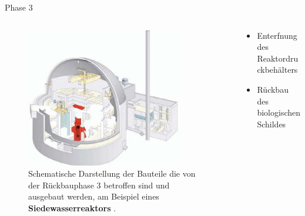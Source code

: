 \begin{frame}{Phase 3}
  \begin{columns}

    \begin{column}{0.48\textwidth}
      \begin{figure}
         \centering
         \includegraphics[width=0.85\textwidth]{./bilder/abbau_schritt_3.PNG}
         \caption{Schematische Darstellung der Bauteile die von der Rückbauphase 3 betroffen sind und ausgebaut werden, am Beispiel eines \textbf{Siedewasserreaktors} \cite{stilllegung_grs}. }
         \label{ fig: phase_3 }
       \end{figure}
     \end{column}

     \begin{column}{0.48\textwidth}
       \begin{itemize}
         \setlength\itemsep{1.2em}
         \item{ Enterfnung des Reaktordruckbehälters }
         \item{ Rückbau des biologischen Schildes }
       \end{itemize}
     \end{column}

  \end{columns}
\end{frame}



